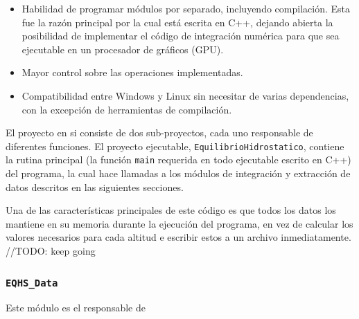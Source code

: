 \begin{itemize}
	\item Habilidad de programar módulos por separado, incluyendo compilación.
	Esta fue la razón principal por la cual está escrita en C++, dejando abierta
	la posibilidad de implementar el código de integración numérica para que sea
	ejecutable en un procesador de gráficos (GPU). 
	\item Mayor control sobre las operaciones implementadas.
 	\item Compatibilidad entre Windows y Linux sin necesitar de varias
 	dependencias, con la excepción de herramientas de compilación.
\end{itemize}

El proyecto en si consiste de dos sub-proyectos, cada uno responsable de
diferentes funciones. El proyecto ejecutable, \verb|EquilibrioHidrostatico|,
contiene la rutina principal (la función \verb|main| requerida en todo
ejecutable escrito en C++) del programa, la cual hace llamadas a los módulos de
integración y extracción de datos descritos en las siguientes secciones. 

Una de las características principales de este código es que todos los datos los
mantiene en su memoria durante la ejecución del programa, en vez de calcular los
valores necesarios para cada altitud e escribir estos a un archivo
inmediatamente. //TODO: keep going

\subsubsection{\verb|EQHS_Data|}
Este módulo es el responsable de 